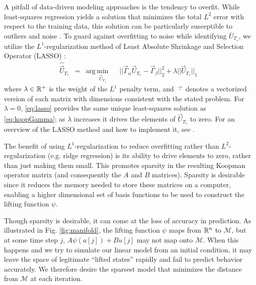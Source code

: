 A pitfall of data-driven modeling approaches is the tendency to overfit.
While least-squares regression yields a solution that minimizes the total $L^2$ error with respect to the training data, this solution can be particularly susceptible to outliers and noise \cite{rousseeuw2005robust}.
To guard against overfitting to noise while identifying $\bar{U}_{T_s}$, we utilize the $L^1$-regularization method of Least Absolute Shrinkage and Selection Operator (LASSO) \cite{tibshirani1996regression}:
\begin{equation}
\begin{aligned}
\hat{\vec{U}}_{T_s} &= 
& \text{arg}~\underset{ \vec{U}_{T_s} }{\text{min}}
& & || \vec{\Gamma}_\alpha \vec{U}_{T_s} - \vec{\Gamma}_\beta ||_2^2 + \lambda || \vec{U}_{T_s} ||_1
\label{eq:lasso}
\end{aligned}
\end{equation}
where $\lambda \in \mathbb{R}^{+}$ is the weight of the $L^1$ penalty term, and $\vec{\cdot}$ denotes a vectorized version of each matrix with dimensions consistent with the stated problem.
For $\lambda = 0$, \eqref{eq:lasso} provides the same unique least-squares solution as \eqref{eq:koopGamma}; as $\lambda$ increases it drives the elements of $\vec{U}_{T_s}$ to zero.
For an overview of the LASSO method and how to implement it, see \citet{tibshirani1996regression}.

The benefit of using $L^1$-regularization to reduce overfitting rather than $L^2$-regularization (e.g. ridge regression) is its ability to drive elements to zero, rather than just making them small.
This promotes sparsity in the resulting Koopman operator matrix (and consequently the $A$ and $B$ matrices).
Sparsity is desirable since it reduces the memory needed to store these matrices on a computer, enabling a higher dimensional set of basis functions to be used to construct the lifting function $\psi$.

Though sparsity is desirable, it can come at the loss of accuracy in prediction. 
As illustrated in Fig. \ref{fig:manifold}, the lifting function $\psi$ maps from $\mathbb{R}^n$ to $\mathcal{M}$, but at some time step $j$, $A\psi(a[j]) + B u[j]$ may not map onto $\mathcal{M}$.
When this happens and we try to simulate our linear model from an initial condition, it may leave the space of legitimate ``lifted states'' rapidly and fail to predict behavior accurately.
We therefore desire the sparsest model that minimizes the distance from $\mathcal{M}$ at each iteration.

